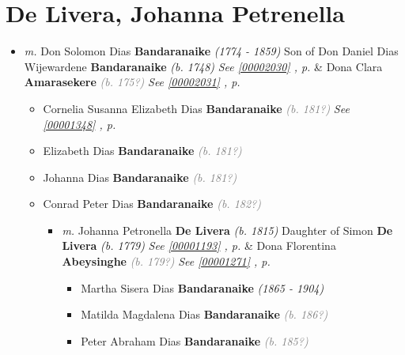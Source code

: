 \documentclass[10pt, openany]{book}
\begin{document}
\chapter{De Livera, Johanna Petrenella}
\label{00001179}
\textcolor{slmaroon}{\textit{}}
\begin{itemize}
\item{\textit{m.} Don Solomon Dias \textbf{Bandaranaike} \textcolor{slorange}{\textit{(1774 - 1859)}} Son of  Don Daniel Dias Wijewardene \textbf{Bandaranaike} \textcolor{slorange}{\textit{(b. 1748)}} \textcolor{slteal}{\textit{See  \autoref{00002030} \textit{, p. \pageref{00002030} }}}  \&  Dona Clara \textbf{Amarasekere} \textcolor{gray}{\textit{(b. 175?)}} \textcolor{slteal}{\textit{See  \autoref{00002031} \textit{, p. \pageref{00002031} }}}   \label{couple:00001179:00001180} \begin{itemize}
\item{Cornelia Susanna Elizabeth Dias \textbf{Bandaranaike} \textcolor{gray}{\textit{(b. 181?)}} \textcolor{slteal}{\textit{See  \autoref{00001348} \textit{, p. \pageref{00001348} }}}}
\item{Elizabeth Dias \textbf{Bandaranaike} \textcolor{gray}{\textit{(b. 181?)}}
  }
\item{Johanna Dias \textbf{Bandaranaike} \textcolor{gray}{\textit{(b. 181?)}}
  }
\item{Conrad Peter Dias \textbf{Bandaranaike} \textcolor{gray}{\textit{(b. 182?)}}
\begin{itemize}
\item{\textit{m.} Johanna Petronella \textbf{De Livera} \textcolor{slorange}{\textit{(b. 1815)}} Daughter of  Simon \textbf{De Livera} \textcolor{slorange}{\textit{(b. 1779)}} \textcolor{slteal}{\textit{See  \autoref{00001193} \textit{, p. \pageref{00001193} }}}  \&  Dona Florentina \textbf{Abeysinghe} \textcolor{gray}{\textit{(b. 179?)}} \textcolor{slteal}{\textit{See  \autoref{00001271} \textit{, p. \pageref{00001271} }}}   \label{couple:00002006:00002007} \begin{itemize}
\item{Martha Sisera Dias \textbf{Bandaranaike} \textcolor{slorange}{\textit{(1865 - 1904)}}
   }
\item{Matilda Magdalena Dias \textbf{Bandaranaike} \textcolor{gray}{\textit{(b. 186?)}}
   }
\item{Peter Abraham Dias \textbf{Bandaranaike} \textcolor{gray}{\textit{(b. 185?)}}
}
\end{itemize}}
\end{itemize}}
\end{itemize}}
\end{itemize}
\end{document}
